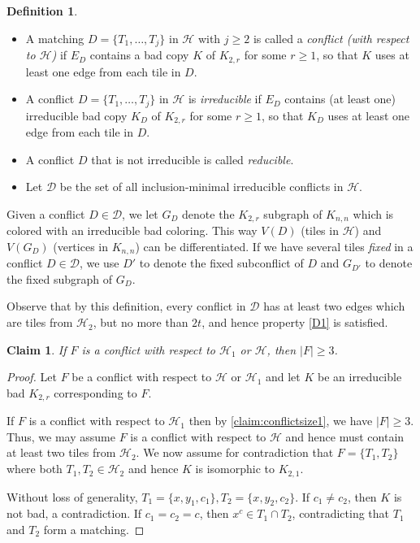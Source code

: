 \documentclass{article}
\newtheorem{claim}[theorem]{Claim}
\theoremstyle{definition}
\newtheorem{definition}[theorem]{Definition}
\newcommand\cH{{\mathcal H}}
\newcommand{\cD}{\mathcal{D}}
\begin{document}
\begin{definition}\hfill
\begin{itemize}
    \item A matching $D = \{T_1, \dots, T_j\}$  in $\cH$ with $j\ge 2$ is called a {\em conflict (with respect to $\mathcal{H}$)} if  $E_D$ contains a bad copy $K$ of $K_{2,r}$ for some $r\ge 1$, so that $K$ uses at least one edge from each tile in $D$. 

    \item  A conflict $D = \{T_1, \dots, T_j\}$  in $\cH$ is  {\em irreducible} if $E_D$ contains (at least one) irreducible bad copy $K_D$ of  $K_{2,r}$ for some $r\ge 1$, so that $K_D$ uses at least one edge from each tile in $D$.
  
 
    \item A conflict $D$ that is not irreducible is called {\em reducible}. 
 

    \item   Let $\cD$ be the set of all inclusion-minimal irreducible conflicts in $\cH$.

 

\end{itemize} 
    
    
\end{definition}


Given a conflict $D\in \mathcal{D}$, we let $G_D$ denote the $K_{2,r}$ subgraph of $K_{n,n}$ which is colored with an irreducible bad coloring. This way $V(D)$ (tiles in $\mathcal{H}$) and $V(G_D)$ (vertices in $K_{n,n}$) can be differentiated. If we have several tiles \emph{fixed} in a conflict $D\in \mathcal{D}$, we use $D'$ to denote the fixed subconflict of $D$ and $G_{D'}$ to denote the fixed subgraph of $G_D$.

Observe that by this definition, every conflict in $\cD$ has at least two edges which are tiles from $\cH_2$, but no more than $2t$, and hence property \ref{D1} is satisfied.



\begin{claim}\label{claim:conflictsize2}
    If $F$ is a conflict with respect to $\cH_1$ or $\cH$, then $|F| \geq 3$.
\end{claim}

\begin{proof}
Let $F$ be a conflict with respect to $\mathcal{H}$ or $\mathcal{H}_1$ and let $K$ be an irreducible bad $K_{2,r}$ corresponding to $F$.

If $F$ is a conflict with respect to $\mathcal{H}_1$ then by \cref{claim:conflictsize1}, we have $|F|\geq 3$. Thus, we may assume $F$ is a conflict with respect to $\mathcal{H}$ and hence must contain at least two tiles from $\mathcal{H}_2$. We now assume for contradiction that $F = \{T_1,T_2\}$ where both $T_1,T_2\in \mathcal{H}_2$ and hence $K$ is isomorphic to $K_{2,1}$.

Without loss of generality, $T_1 = \{ x, y_1, c_1 \}, T_2 = \{ x, y_2, c_2 \}$.  If $c_1 \neq c_2$, then $K$ is not bad, a contradiction. If $c_1 = c_2 = c$, then $x^c \in T_1 \cap T_2$, contradicting that $T_1$ and $T_2$ form a matching. 
\end{proof}
\end{document}
